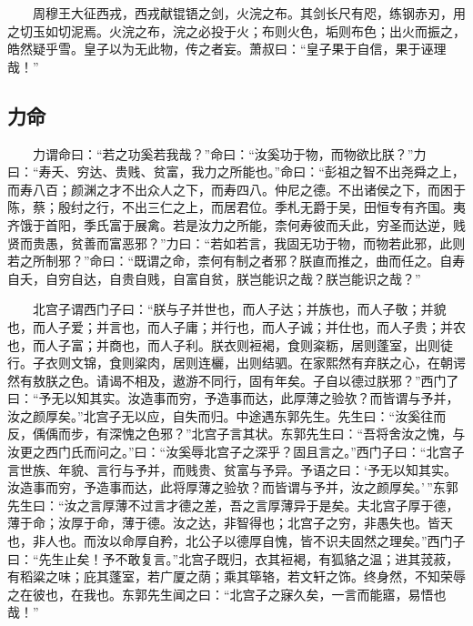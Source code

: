 　　周穆王大征西戎，西戎献锟铻之剑，火浣之布。其剑长尺有咫，练钢赤刃，用之切玉如切泥焉。火浣之布，浣之必投于火；布则火色，垢则布色；出火而振之，皓然疑乎雪。皇子以为无此物，传之者妄。萧叔曰：``皇子果于自信，果于诬理哉！''

\hypertarget{ux529bux547d}{%
\subsection{力命}\label{ux529bux547d}}

　　力谓命曰：``若之功奚若我哉？''命曰：``汝奚功于物，而物欲比朕？''力曰：``寿夭、穷达、贵贱、贫富，我力之所能也。''命曰：``彭祖之智不出尧舜之上，而寿八百；颜渊之才不出众人之下，而寿四八。仲尼之德。不出诸侯之下，而困于陈，蔡；殷纣之行，不出三仁之上，而居君位。季札无爵于吴，田恒专有齐国。夷齐饿于首阳，季氏富于展禽。若是汝力之所能，柰何寿彼而夭此，穷圣而达逆，贱贤而贵愚，贫善而富恶邪？''力曰：``若如若言，我固无功于物，而物若此邪，此则若之所制邪？''命曰：``既谓之命，柰何有制之者邪？朕直而推之，曲而任之。自寿自夭，自穷自达，自贵自贱，自富自贫，朕岂能识之哉？朕岂能识之哉？''

　　北宫子谓西门子曰：``朕与子并世也，而人子达；并族也，而人子敬；并貌也，而人子爱；并言也，而人子庸；并行也，而人子诚；并仕也，而人子贵；并农也，而人子富；并商也，而人子利。朕衣则裋褐，食则粢粝，居则蓬室，出则徒行。子衣则文锦，食则粱肉，居则连欐，出则结驷。在家熙然有弃朕之心，在朝谔然有敖朕之色。请谒不相及，遨游不同行，固有年矣。子自以德过朕邪？''西门了曰：``予无以知其实。汝造事而穷，予造事而达，此厚薄之验欤？而皆谓与予并，汝之颜厚矣。''北宫子无以应，自失而归。中途遇东郭先生。先生曰：``汝奚往而反，偊偊而步，有深愧之色邪？''北宫子言其状。东郭先生曰：``吾将舍汝之愧，与汝更之西门氏而问之。''曰：``汝奚辱北宫子之深乎？固且言之。''西门子曰：``北宫子言世族、年貌、言行与予并，而贱贵、贫富与予异。予语之曰：`予无以知其实。汝造事而穷，予造事而达，此将厚薄之验欤？而皆谓与予并，汝之颜厚矣。'\,''东郭先生曰：``汝之言厚薄不过言才德之差，吾之言厚薄异于是矣。夫北宫子厚于德，薄于命；汝厚于命，薄于德。汝之达，非智得也；北宫子之穷，非愚失也。皆天也，非人也。而汝以命厚自矜，北公子以德厚自愧，皆不识夫固然之理矣。''西门子曰：``先生止矣！予不敢复言。''北宫子既归，衣其裋褐，有狐貉之温；进其茙菽，有稻粱之味；庇其蓬室，若广厦之荫；乘其筚辂，若文轩之饰。终身然，不知荣辱之在彼也，在我也。东郭先生闻之曰：``北宫子之寐久矣，一言而能寤，易悟也哉！''

